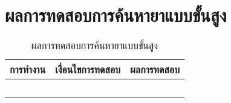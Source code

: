 \section{ผลการทดสอบการค้นหายาแบบขั้นสูง}
	\begin{table}[H]
		\caption{ผลการทดสอบการค้นหายาแบบขั้นสูง}
		\centering	
		\label{tab:test2}
		\begin{tabular}{ | p{4.5cm} | p{4.5cm} | p{4.5cm} | }
		\hline
		การทำงาน & เงื่อนไขการทดสอบ & ผลการทดสอบ \\ \hline
		\setstretch{1.0}{ทดสอบการค้นหาแบบขั้นสูง }
		& \setstretch{1.0}{ไม่กรอกข้อมูลลักษณะยา }
		& \setstretch{1.0}{แอปพลิเคชันแสดงข้อความ “ไม่พบคำร้องขอ”} \\ \cline{2-3} 
		& \setstretch{1.0}{กรอกข้อมูลลักษณะยาไม่ครบ }
		& \setstretch{1.0}{แอปพลิเคชันแสดงรายการค้นหา และแสดงรายการยา} \\ \cline{2-3} 
		& \setstretch{1.0}{กรอกข้อมูลลักษณะยาที่ไม่มีในฐานข้อมูล }
		& \setstretch{1.0}{แอปพลิเคชันแสดงข้อความ “ไม่พบคำร้องขอ”} \\ \cline{2-3} 
		& \setstretch{1.0}{กรอกข้อมูลลักษณะยาครบถูกต้อง }
		& \setstretch{1.0}{แอปพลิเคชันแสดงรายการค้นหา และแสดงรายการยา} \\ \cline{2-3} 
		& \setstretch{1.0}{กดปุ่มย้อนกลับ }
		& \setstretch{1.0}{แอปพลิเคชันจะกลับมาแสดงหน้าค้นหายา} \\ \hline
		\end{tabular}
	\end{table}



